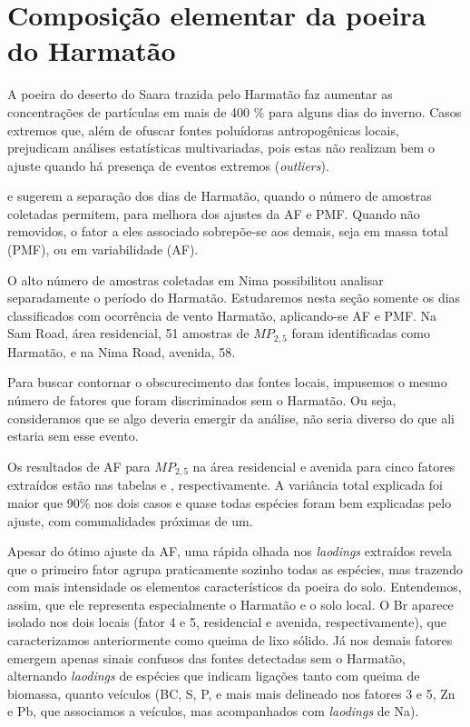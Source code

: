 \newpage
\section{Composição elementar da poeira do Harmatão}

A poeira do deserto do Saara trazida pelo Harmatão faz aumentar as concentrações
de partículas em mais de 400 \% para alguns dias do inverno. Casos extremos 
que, além de ofuscar fontes poluídoras antropogênicas locais, prejudicam 
análises estatísticas multivariadas, pois estas não realizam bem o ajuste 
quando há presença de eventos extremos (\textit{outliers}).

\citet{aboh2009} e \citet{ofosu2013} sugerem a separação dos dias de Harmatão, 
quando o número de amostras coletadas permitem, para melhora dos ajustes da AF e PMF. 
Quando não removidos, o fator a eles associado sobrepõe-se aos demais, seja em 
massa total (PMF), ou em variabilidade (AF).

O alto número de amostras coletadas em Nima possibilitou analisar separadamente 
o período do Harmatão. Estudaremos nesta seção somente os dias classificados 
com ocorrência de vento Harmatão, aplicando-se AF e PMF. 
Na Sam Road, área residencial, 51 amostras de $MP_{2,5}$ foram identificadas 
como Harmatão, e na Nima Road, avenida, 58. 

Para buscar contornar o obscurecimento das fontes locais, impusemos o mesmo 
número de fatores que foram discriminados sem o Harmatão. Ou seja, consideramos 
que se algo deveria emergir da análise, não seria diverso do que ali estaria sem
esse evento.

Os resultados de AF para $MP_{2,5}$ na área residencial e avenida para cinco 
fatores extraídos estão nas tabelas \label{table:AF_RFeH5} e \label{table:AF_TFeH5}, 
respectivamente.  A variância total explicada foi maior que 90\% nos dois  
casos e quase todas espécies foram bem explicadas pelo ajuste, com comunalidades 
próximas de um. 

Apesar do ótimo ajuste da AF, uma rápida olhada nos \textit{laodings} extraídos
revela que o primeiro fator agrupa praticamente sozinho todas as espécies, 
mas trazendo com mais intensidade os elementos característicos da poeira do solo.
Entendemos, assim, que ele representa especialmente o Harmatão e o solo local. 
O Br aparece isolado nos dois locais (fator 4 e 5, residencial e avenida, 
respectivamente), que caracterizamos anteriormente como queima de lixo sólido. 
Já nos demais fatores emergem apenas sinais confusos das fontes detectadas sem 
o Harmatão, alternando \textit{laodings} de espécies que indicam ligações tanto 
com queima de biomassa, quanto veículos (BC, S, P, e mais mais delineado nos 
fatores 3 e 5, Zn e Pb, que associamos a veículos, mas acompanhados com 
\textit{laodings} de Na).

